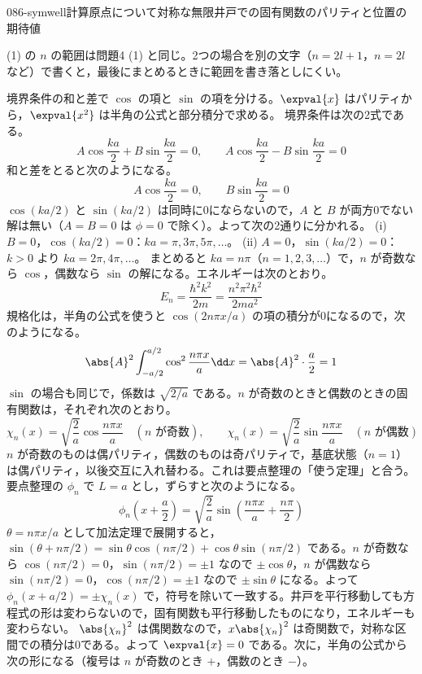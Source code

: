 \documentclass[uplatex,dvipdfmx,a4paper,11pt]{jsarticle}
\begin{document}
\begin{mondai}{086-symwell}{計算}{原点について対称な無限井戸での固有関数のパリティと位置の期待値}
\begin{kizuki}
\item {} (1) の $n$ の範囲は問題4 (1) と同じ。2つの場合を別の文字（$n=2l+1$，$n=2l$ など）で書くと，最後にまとめるときに範囲を書き落としにくい。
\end{kizuki}
\begin{tadashii}
\houshin 境界条件の和と差で $\cos$ の項と $\sin$ の項を分ける。$\expval{x}$ はパリティから，$\expval{x^{2}}$ は半角の公式と部分積分で求める。
\keisan
{} 境界条件は次の2式である。
\[ A\cos\frac{ka}{2}+B\sin\frac{ka}{2}=0,\qquad A\cos\frac{ka}{2}-B\sin\frac{ka}{2}=0 \]
和と差をとると次のようになる。
\[ A\cos\frac{ka}{2}=0,\qquad B\sin\frac{ka}{2}=0 \]
$\cos(ka/2)$ と $\sin(ka/2)$ は同時に0にならないので，$A$ と $B$ が両方0でない解は無い（$A=B=0$ は $\phi=0$ で除く）。よって次の2通りに分かれる。
(i) $B=0$，$\cos(ka/2)=0$：$ka=\pi,3\pi,5\pi,\dots$。
(ii) $A=0$，$\sin(ka/2)=0$：$k>0$ より $ka=2\pi,4\pi,\dots$。
まとめると $ka=n\pi$（$n=1,2,3,\dots$）で，$n$ が奇数なら $\cos$，偶数なら $\sin$ の解になる。エネルギーは次のとおり。
\[ E_{n}=\frac{\hbar^{2}k^{2}}{2m}=\frac{n^{2}\pi^{2}\hbar^{2}}{2ma^{2}} \]
規格化は，半角の公式を使うと $\cos(2n\pi x/a)$ の項の積分が0になるので，次のようになる。
\[ \abs{A}^{2}\int_{-a/2}^{a/2}\cos^{2}\frac{n\pi x}{a}\dd x=\abs{A}^{2}\cdot\frac{a}{2}=1 \]
$\sin$ の場合も同じで，係数は $\sqrt{2/a}$ である。$n$ が奇数のときと偶数のときの固有関数は，それぞれ次のとおり。
\[ \chi_{n}(x)=\sqrt{\frac{2}{a}}\cos\frac{n\pi x}{a}\quad(\text{$n$ が奇数}),\qquad \chi_{n}(x)=\sqrt{\frac{2}{a}}\sin\frac{n\pi x}{a}\quad(\text{$n$ が偶数}) \]
$n$ が奇数のものは偶パリティ，偶数のものは奇パリティで，基底状態（$n=1$）は偶パリティ，以後交互に入れ替わる。これは要点整理の「使う定理」と合う。
 要点整理の $\phi_{n}$ で $L=a$ とし，ずらすと次のようになる。
\[ \phi_{n}\left(x+\frac{a}{2}\right)=\sqrt{\frac{2}{a}}\sin\left(\frac{n\pi x}{a}+\frac{n\pi}{2}\right) \]
$\theta=n\pi x/a$ として加法定理で展開すると，$\sin(\theta+n\pi/2)=\sin\theta\cos(n\pi/2)+\cos\theta\sin(n\pi/2)$ である。$n$ が奇数なら $\cos(n\pi/2)=0$，$\sin(n\pi/2)=\pm 1$ なので $\pm\cos\theta$，$n$ が偶数なら $\sin(n\pi/2)=0$，$\cos(n\pi/2)=\pm 1$ なので $\pm\sin\theta$ になる。よって $\phi_{n}(x+a/2)=\pm\chi_{n}(x)$ で，符号を除いて一致する。井戸を平行移動しても方程式の形は変わらないので，固有関数も平行移動したものになり，エネルギーも変わらない。
 $\abs{\chi_{n}}^{2}$ は偶関数なので，$x\abs{\chi_{n}}^{2}$ は奇関数で，対称な区間での積分は0である。よって $\expval{x}=0$ である。次に，半角の公式から次の形になる（複号は $n$ が奇数のとき $+$，偶数のとき $-$）。

\end{tadashii}
\end{mondai}
\end{document}
